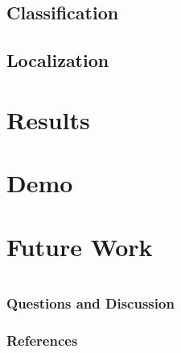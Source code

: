 \documentclass{beamer}
\newcommand{\slide}[2]
{
\begin{frame}
\frametitle{#1} 

#2

\end{frame}
}
\begin{document}
\subsection{Classification}

\subsection{Localization}

\section{Results}

\section{Demo}

\section{Future Work}

\section{}

\slide{Questions and Discussion}
{}
\begin{frame}[allowframebreaks]
        \frametitle{References}
        
        
\end{frame}
\end{document}
